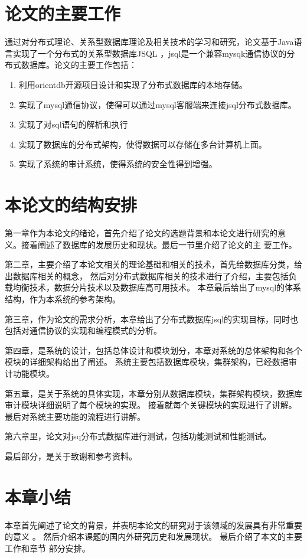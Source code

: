 \section{论文的主要工作}
通过对分布式理论、关系型数据库理论及相关技术的学习和研究，论文基于Java语言实现了一个分布式的关系型数据库JSQL
，jsql是一个兼容mysqk通信协议的分布式数据库。论文的主要工作包括：
\begin{enumerate}
	\item 利用orientdb开源项目设计和实现了分布式数据库的本地存储。
	\item 实现了mysql通信协议，使得可以通过mysql客服端来连接jsql分布式数据库。
	\item 实现了对sql语句的解析和执行
	\item 实现了数据库的分布式架构，使得数据可以存储在多台计算机上面。
	\item 实现了系统的审计系统，使得系统的安全性得到增强。
\end{enumerate}
\section{本论文的结构安排}
第一章作为本论文的绪论，首先介绍了论文的选题背景和本论文进行研究的意
义。接着阐述了数据库的发展历史和现状。最后一节里介绍了论文的主
要工作。

第二章，主要介绍了本论文相关的理论基础和相关的技术，首先给数据库分类，给出数据库相关的概念，
然后对分布式数据库相关的技术进行了介绍，主要包括负载均衡技术，数据分片技术以及数据库高可用技术。
本章最后给出了mysql的体系结构，作为本系统的参考架构。

第三章，作为论文的需求分析，本章给出了分布式数据库jsql的实现目标，同时也
包括对通信协议的实现和编程模式的分析。

第四章，是系统的设计，包括总体设计和模块划分，本章对系统的总体架构和各个模块的详细架构给出了阐述。
系统主要包括数据库模块，集群架构，已经数据审计功能模块。

第五章，是关于系统的具体实现，本章分别从数据库模块，集群架构模块，数据库审计模块详细说明了每个模块的实现。
接着就每个关键模块的实现进行了讲解。最后对系统主要功能的流程进行讲解。

第六章里，论文对jsq分布式数据库进行测试，包括功能测试和性能测试。

最后部分，是关于致谢和参考资料。
\section{本章小结}
本章首先阐述了论文的背景，并表明本论文的研究对于该领域的发展具有非常重要的意义
。 然后介绍本课题的国内外研究历史和发展现状。 最后介绍了本文的主要工作和章节
部分安排。